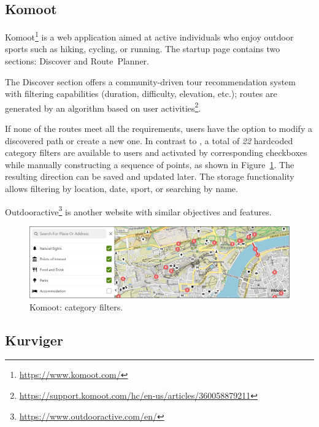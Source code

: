 \subsection{Komoot}\label{ssec:komoot}

Komoot\footnote{\href{https://www.komoot.com/}{https://www.komoot.com/}} is a web application aimed at active individuals who enjoy outdoor sports such as hiking, cycling, or running. The startup page contains two sections: Discover and Route~Planner.

The Discover section offers a community-driven tour recommendation system with filtering capabilities (duration, difficulty, elevation, etc.); routes are generated by an algorithm based on user activities\footnote{\href{https://support.komoot.com/hc/en-us/articles/360058879211}{https://support.komoot.com/hc/en-us/articles/360058879211}}.

If none of the routes meet all the requirements, users have the option to modify a discovered path or create a new one. In contrast to \emph{}, a total of \emph{22} hard\-cod\-ed category filters are available to users and activated by corresponding check\-box\-es while manually constructing a sequence of points, as shown in Figure~\ref{fig:komoot-categories}. The resulting direction can be saved and updated later. The storage functionality allows filtering by location, date, sport, or searching by name.

Outdooractive\footnote{\href{https://www.outdooractive.com/en/}{https://www.outdooractive.com/en/}} is another website with similar objectives and features.

\begin{figure}[!h]
\centering
\includegraphics[width=\linewidth]{img/analysis/komoot-categories.png}
\caption{Komoot: category filters.}
\label{fig:komoot-categories}
\end{figure}

\subsection{Kurviger}\label{ssec:kurviger}

